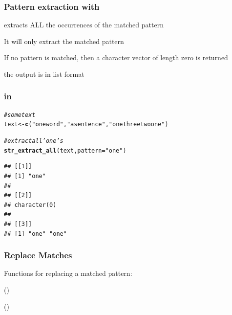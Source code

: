\documentclass[12pt]{beamer}\usepackage[]{graphicx}\usepackage[]{color}
\makeatletter
\newcommand{\hlstr}[1]{\textcolor[rgb]{0.192,0.494,0.8}{#1}}%
\newcommand{\hlcom}[1]{\textcolor[rgb]{0.678,0.584,0.686}{\textit{#1}}}%
\newcommand{\hlstd}[1]{\textcolor[rgb]{0.345,0.345,0.345}{#1}}%
\newcommand{\hlkwb}[1]{\textcolor[rgb]{0.69,0.353,0.396}{#1}}%
\newcommand{\hlkwc}[1]{\textcolor[rgb]{0.333,0.667,0.333}{#1}}%
\newcommand{\hlkwd}[1]{\textcolor[rgb]{0.737,0.353,0.396}{\textbf{#1}}}%
\newenvironment{kframe}{%
 \def\at@end@of@kframe{}%
 \ifinner\ifhmode%
  \def\at@end@of@kframe{\end{minipage}}%
  \begin{minipage}{\columnwidth}%
 \fi\fi%
 \def\FrameCommand##1{\hskip\@totalleftmargin \hskip-\fboxsep
 \colorbox{shadecolor}{##1}\hskip-\fboxsep
     \hskip-\linewidth \hskip-\@totalleftmargin \hskip\columnwidth}%
 \MakeFramed {\advance\hsize-\width
   \@totalleftmargin\z@ \linewidth\hsize
   \@setminipage}}%
 {\par\unskip\endMakeFramed%
 \at@end@of@kframe}
\newenvironment{knitrout}{}{} %
\makeatother
\begin{document}

\begin{frame}[fragile]
\frametitle{Pattern extraction with }

\bbi
  \item {\hilit {}} extracts ALL the occurrences of the matched pattern
  \item It will only extract the matched pattern
  \item If no pattern is matched, then a character vector of length zero is returned
  \item the output is in list format
\ei

\end{frame}


\begin{frame}[fragile]
\frametitle{ in }

\begin{knitrout}\footnotesize
{}\color{fgcolor}\begin{kframe}
\begin{alltt}
\hlcom{# some text}
\hlstd{text} \hlkwb{<-} \hlkwd{c}\hlstd{(}\hlstr{"one word"}\hlstd{,} \hlstr{"a sentence"}\hlstd{,} \hlstr{"one three two one"}\hlstd{)}

\hlcom{# extract all 'one's}
\hlkwd{str_extract_all}\hlstd{(text,} \hlkwc{pattern} \hlstd{=} \hlstr{"one"}\hlstd{)}
\end{alltt}
\begin{verbatim}
## [[1]]
## [1] "one"
## 
## [[2]]
## character(0)
## 
## [[3]]
## [1] "one" "one"
\end{verbatim}
\end{kframe}
\end{knitrout}

\end{frame}


\begin{frame}
\begin{center}
\Huge{}
\end{center}
\end{frame}


\begin{frame}
\frametitle{Replace Matches}

Functions for replacing a matched pattern: 
\bbi
  \item {}
  \item {}
  \item {} ()
  \item {} ()
\ei

\end{frame}
\end{document}
